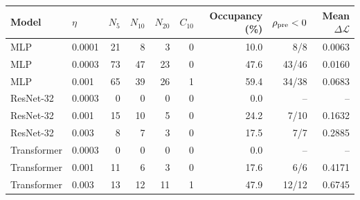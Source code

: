 \begin{tabular}{llrrrrrrr}
\toprule
Model & $\eta$ & $N_{5}$ & $N_{10}$ & $N_{20}$ & $C_{10}$ & Occupancy (\%) & $\rho_{\rm pre}<0$ & Mean $\Delta\mathcal L$ \\
\midrule
MLP & 0.0001 & 21 & 8 & 3 & 0 & 10.0 & 8/8 & 0.0063 \\
MLP & 0.0003 & 73 & 47 & 23 & 0 & 47.6 & 43/46 & 0.0160 \\
MLP & 0.001 & 65 & 39 & 26 & 1 & 59.4 & 34/38 & 0.0683 \\
ResNet-32 & 0.0003 & 0 & 0 & 0 & 0 & 0.0 & -- & -- \\
ResNet-32 & 0.001 & 15 & 10 & 5 & 0 & 24.2 & 7/10 & 0.1632 \\
ResNet-32 & 0.003 & 8 & 7 & 3 & 0 & 17.5 & 7/7 & 0.2885 \\
Transformer & 0.0003 & 0 & 0 & 0 & 0 & 0.0 & -- & -- \\
Transformer & 0.001 & 11 & 6 & 3 & 0 & 17.6 & 6/6 & 0.4171 \\
Transformer & 0.003 & 13 & 12 & 11 & 1 & 47.9 & 12/12 & 0.6745 \\
\bottomrule
\end{tabular}
